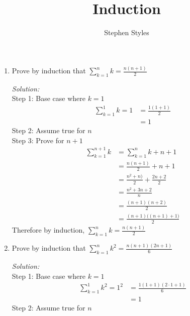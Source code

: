 \documentclass[12pt]{article}
\title{Induction}
\author{Stephen Styles}
\theoremstyle{remark}
\begin{document}
\maketitle

\begin{enumerate}

\item Prove by induction that $\displaystyle{\sum_{k=1}^n k = \frac{n(n+1)}{2}}$
\begin{mdframed}[style=TheoremFrame]
\textit{Solution:}\\

Step 1: Base case where $k=1$
\begin{align*}
\sum_{k=1}^1 k = 1 &= \frac{1(1+1)}{2}\\
&= 1
\end{align*}
Step 2: Assume true for $n$\\

Step 3: Prove for $n+1$
\begin{align*}
\sum_{k=1}^{n+1} k &= \sum_{k=1}^{n} k + n+1\\
&= \frac{n(n+1)}{2} + n+1\\
&= \frac{n^2+n)}{2} + \frac{2n+2}{2}\\
&= \frac{n^2 + 3n + 2}{n}\\
&= \frac{(n+1)(n+2)}{2}\\
&= \frac{(n+1)\big((n+1)+1\big)}{2}
\end{align*}
Therefore by induction, $\displaystyle{\sum_{k=1}^n k = \frac{n(n+1)}{2}}$
\end{mdframed}
\newpage
\item Prove by induction that $\displaystyle{\sum_{k=1}^n k^2 = \frac{n(n+1)(2n+1)}{6}}$
\begin{mdframed}[style=TheoremFrame]
\textit{Solution:}\\

Step 1: Base case where $k=1$
\begin{align*}
\sum_{k=1}^1 k^2 = 1^2 &= \frac{1(1+1)(2\cdot1+1)}{6}\\
&= 1
\end{align*}
Step 2: Assume true for $n$\\


\end{mdframed}
\end{enumerate}
\end{document}
